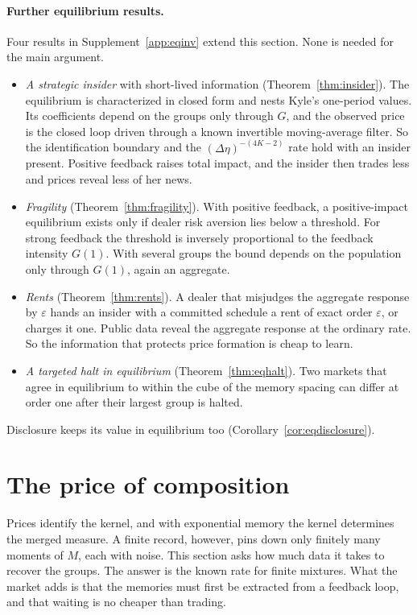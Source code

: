 \documentclass[12pt]{article}
\theoremstyle{definition}
\theoremstyle{remark}
\begin{document}
\paragraph{Further equilibrium results.} Four results in Supplement~\ref{app:eqinv} extend this section. None is needed for the main argument.
\begin{itemize}[itemsep=1pt,topsep=2pt]
\item \emph{A strategic insider} with short-lived information (Theorem~\ref{thm:insider}). The equilibrium is characterized in closed form and nests Kyle's one-period values. Its coefficients depend on the groups only through $G$, and the observed price is the closed loop driven through a known invertible moving-average filter. So the identification boundary and the $(\Delta\eta)^{-(4K-2)}$ rate hold with an insider present. Positive feedback raises total impact, and the insider then trades less and prices reveal less of her news.
\item \emph{Fragility} (Theorem~\ref{thm:fragility}). With positive feedback, a positive-impact equilibrium exists only if dealer risk aversion lies below a threshold. For strong feedback the threshold is inversely proportional to the feedback intensity $G(1)$. With several groups the bound depends on the population only through $G(1)$, again an aggregate.
\item \emph{Rents} (Theorem~\ref{thm:rents}). A dealer that misjudges the aggregate response by $\varepsilon$ hands an insider with a committed schedule a rent of exact order $\varepsilon$, or charges it one. Public data reveal the aggregate response at the ordinary rate. So the information that protects price formation is cheap to learn.
\item \emph{A targeted halt in equilibrium} (Theorem~\ref{thm:eqhalt}). Two markets that agree in equilibrium to within the cube of the memory spacing can differ at order one after their largest group is halted.
\end{itemize}
Disclosure keeps its value in equilibrium too (Corollary~\ref{cor:eqdisclosure}).

\section{The price of composition}\label{sec:cost}

Prices identify the kernel, and with exponential memory the kernel determines the merged measure. A finite record, however, pins down only finitely many moments of $M$, each with noise. This section asks how much data it takes to recover the groups. The answer is the known rate for finite mixtures. What the market adds is that the memories must first be extracted from a feedback loop, and that waiting is no cheaper than trading.
\end{document}
